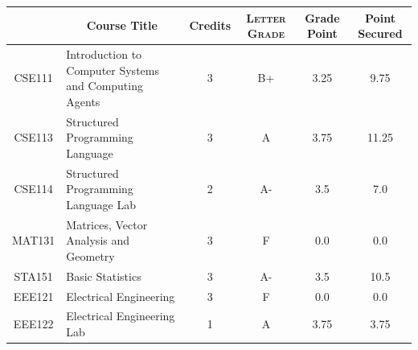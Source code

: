 \documentclass[11pt]{article}
\newcommand*{\numtwo}[1]{\pgfmathprintnumber[
                    fixed, precision=2, fixed zerofill=true]{#1}}
\begin{document}
                \begin{center}
                    \renewcommand{\arraystretch}{1.08}
                    
                \begin{tabular}{|c|l|c|>{\scshape}c|c|c|}
                \hline  \rule[-1ex]{0pt}{3.5ex} {\centering{\bf Course Code}} &  \multicolumn{1}{c|}{\textbf{Course Title}}  & {\bf Credits} & {\bf Letter Grade} & {\bf Grade Point} & {\bf Point Secured}  \\ 
                \hline   CSE111 &  Introduction to Computer Systems and Computing Agents		 & 3 & B+ & 3.25 & 9.75 \\ %
                \hline   CSE113 &  Structured Programming Language		 & 3 & A & 3.75 & 11.25 \\ %
                \hline   CSE114 &  Structured Programming Language Lab		 & 2 & A- & 3.5 & 7.0 \\ %
                \hline   MAT131 &  Matrices, Vector Analysis and Geometry		 & 3 & F & 0.0 & 0.0 \\ %
                \hline   STA151 &  Basic Statistics		 & 3 & A- & 3.5 & 10.5 \\ %
                \hline   EEE121 &  Electrical Engineering		 & 3 & F & 0.0 & 0.0 \\ %
                \hline   EEE122 &  Electrical Engineering Lab		 & 1 & A & 3.75 & 3.75 \\ %

\hline                %
                \end{tabular}
                \end{center}
                \renewcommand{\arraystretch}{1.03}
\end{document}
